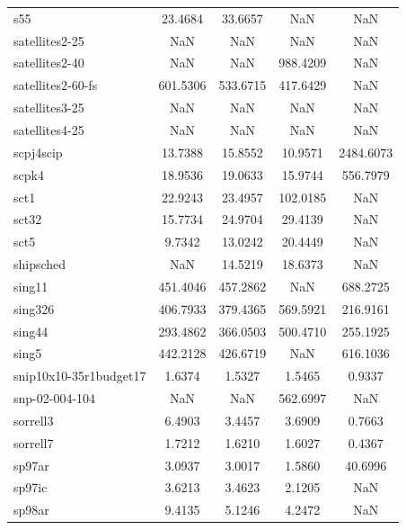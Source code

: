 \begin{longtable}{lcccc}
s55                         &   23.4684 &  33.6657 &       NaN &       NaN \\
satellites2-25              &       NaN &      NaN &       NaN &       NaN \\
satellites2-40              &       NaN &      NaN &  988.4209 &       NaN \\
satellites2-60-fs           &  601.5306 & 533.6715 &  417.6429 &       NaN \\
satellites3-25              &       NaN &      NaN &       NaN &       NaN \\
satellites4-25              &       NaN &      NaN &       NaN &       NaN \\
scpj4scip                   &   13.7388 &  15.8552 &   10.9571 & 2484.6073 \\
scpk4                       &   18.9536 &  19.0633 &   15.9744 &  556.7979 \\
sct1                        &   22.9243 &  23.4957 &  102.0185 &       NaN \\
sct32                       &   15.7734 &  24.9704 &   29.4139 &       NaN \\
sct5                        &    9.7342 &  13.0242 &   20.4449 &       NaN \\
shipsched                   &       NaN &  14.5219 &   18.6373 &       NaN \\
sing11                      &  451.4046 & 457.2862 &       NaN &  688.2725 \\
sing326                     &  406.7933 & 379.4365 &  569.5921 &  216.9161 \\
sing44                      &  293.4862 & 366.0503 &  500.4710 &  255.1925 \\
sing5                       &  442.2128 & 426.6719 &       NaN &  616.1036 \\
snip10x10-35r1budget17      &    1.6374 &   1.5327 &    1.5465 &    0.9337 \\
snp-02-004-104              &       NaN &      NaN &  562.6997 &       NaN \\
sorrell3                    &    6.4903 &   3.4457 &    3.6909 &    0.7663 \\
sorrell7                    &    1.7212 &   1.6210 &    1.6027 &    0.4367 \\
sp97ar                      &    3.0937 &   3.0017 &    1.5860 &   40.6996 \\
sp97ic                      &    3.6213 &   3.4623 &    2.1205 &       NaN \\
sp98ar                      &    9.4135 &   5.1246 &    4.2472 &       NaN \\

\end{longtable}
